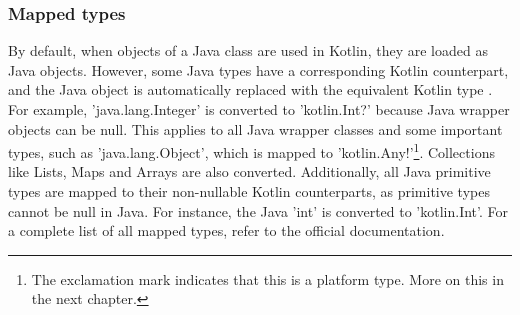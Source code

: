 \documentclass[a4paper,11pt]{article}
\begin{document}
\subsubsection{Mapped types}
By default, when objects of a Java class are used in Kotlin, they are loaded as Java objects. However, some Java types have a corresponding Kotlin counterpart, and the Java object is automatically replaced with the equivalent Kotlin type \cite{interop-mapped-types}. For example, 'java.lang.Integer' is converted to 'kotlin.Int?' because Java wrapper objects can be null. This applies to all Java wrapper classes and some important types, such as 'java.lang.Object', which is mapped to 'kotlin.Any!'\footnote{The exclamation mark indicates that this is a platform type. More on this in the next chapter.}. Collections like Lists, Maps and Arrays are also converted. Additionally, all Java primitive types are mapped to their non-nullable Kotlin counterparts, as primitive types cannot be null in Java. For instance, the Java 'int' is converted to 'kotlin.Int'. For a complete list of all mapped types, refer to the official documentation.
\end{document}
